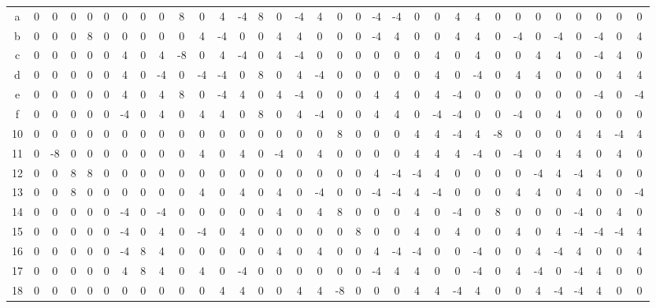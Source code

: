 \documentclass[11pt]{article}
\begin{document}
\begin{table}[htbp]
{\begin{tabular}{c|*{32}{c}}
    a & 0 & 0 & 0 & 0 & 0 & 0 & 0 & 0 & 8 & 0 & 4 & -4 & 8 & 0 & -4 & 4 & 0 & 0 & -4 & -4 & 0 & 0 & 4 & 4 & 0 & 0 & 0 & 0 & 0 & 0 & 0 & 0 \\
    b & 0 & 0 & 0 & 8 & 0 & 0 & 0 & 0 & 0 & 4 & -4 & 0 & 0 & 4 & 4 & 0 & 0 & 0 & -4 & 4 & 0 & 0 & 4 & 4 & 0 & -4 & 0 & -4 & 0 & -4 & 0 & 4 \\
    c & 0 & 0 & 0 & 0 & 0 & 4 & 0 & 4 & -8 & 0 & 4 & -4 & 0 & 4 & -4 & 0 & 0 & 0 & 0 & 0 & 0 & 4 & 0 & 4 & 0 & 0 & 4 & 4 & 0 & -4 & 4 & 0 \\
    d & 0 & 0 & 0 & 0 & 0 & 4 & 0 & -4 & 0 & -4 & -4 & 0 & 8 & 0 & 4 & -4 & 0 & 0 & 0 & 0 & 0 & 4 & 0 & -4 & 0 & 4 & 4 & 0 & 0 & 0 & 4 & 4 \\
    e & 0 & 0 & 0 & 0 & 0 & 4 & 0 & 4 & 8 & 0 & -4 & 4 & 0 & 4 & -4 & 0 & 0 & 0 & 4 & 4 & 0 & 4 & -4 & 0 & 0 & 0 & 0 & 0 & 0 & -4 & 0 & -4 \\
    f & 0 & 0 & 0 & 0 & 0 & -4 & 0 & 4 & 0 & 4 & 4 & 0 & 8 & 0 & 4 & -4 & 0 & 0 & 4 & 4 & 0 & -4 & -4 & 0 & 0 & -4 & 0 & 4 & 0 & 0 & 0 & 0 \\
    10 & 0 & 0 & 0 & 0 & 0 & 0 & 0 & 0 & 0 & 0 & 0 & 0 & 0 & 0 & 0 & 0 & 8 & 0 & 0 & 0 & 4 & 4 & -4 & 4 & -8 & 0 & 0 & 0 & 4 & 4 & -4 & 4 \\
    11 & 0 & -8 & 0 & 0 & 0 & 0 & 0 & 0 & 0 & 4 & 0 & 4 & 0 & -4 & 0 & 4 & 0 & 0 & 0 & 0 & 4 & 4 & 4 & -4 & 0 & -4 & 0 & 4 & 4 & 0 & 4 & 0 \\
    12 & 0 & 0 & 8 & 8 & 0 & 0 & 0 & 0 & 0 & 0 & 0 & 0 & 0 & 0 & 0 & 0 & 0 & 0 & 4 & -4 & -4 & 4 & 0 & 0 & 0 & 0 & -4 & 4 & -4 & 4 & 0 & 0 \\
    13 & 0 & 0 & 8 & 0 & 0 & 0 & 0 & 0 & 0 & 4 & 0 & 4 & 0 & 4 & 0 & -4 & 0 & 0 & -4 & -4 & 4 & -4 & 0 & 0 & 0 & 4 & 4 & 0 & 4 & 0 & 0 & -4 \\
    14 & 0 & 0 & 0 & 0 & 0 & -4 & 0 & -4 & 0 & 0 & 0 & 0 & 0 & 4 & 0 & 4 & 8 & 0 & 0 & 0 & 4 & 0 & -4 & 0 & 8 & 0 & 0 & 0 & -4 & 0 & 4 & 0 \\
    15 & 0 & 0 & 0 & 0 & 0 & -4 & 0 & 4 & 0 & -4 & 0 & 4 & 0 & 0 & 0 & 0 & 0 & 8 & 0 & 0 & 4 & 0 & 4 & 0 & 0 & 4 & 0 & 4 & -4 & -4 & -4 & 4 \\
    16 & 0 & 0 & 0 & 0 & 0 & -4 & 8 & 4 & 0 & 0 & 0 & 0 & 0 & 4 & 0 & 4 & 0 & 0 & 4 & -4 & -4 & 0 & 0 & -4 & 0 & 0 & 4 & -4 & 4 & 0 & 0 & 4 \\
    17 & 0 & 0 & 0 & 0 & 0 & 4 & 8 & 4 & 0 & 4 & 0 & -4 & 0 & 0 & 0 & 0 & 0 & 0 & -4 & 4 & 4 & 0 & 0 & -4 & 0 & 4 & -4 & 0 & -4 & 4 & 0 & 0 \\
    18 & 0 & 0 & 0 & 0 & 0 & 0 & 0 & 0 & 0 & 0 & 4 & 4 & 0 & 0 & 4 & 4 & -8 & 0 & 0 & 0 & 4 & 4 & -4 & 4 & 0 & 0 & 4 & -4 & -4 & 4 & 0 & 0 \\

\end{tabular}}
\end{table}
\end{document}
